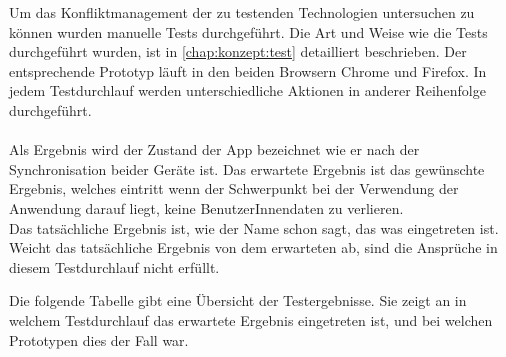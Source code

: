 Um das Konfliktmanagement der zu testenden Technologien untersuchen zu können wurden manuelle Tests durchgeführt.
Die Art und Weise wie die Tests durchgeführt wurden, ist in \autoref{chap:konzept:test} detailliert beschrieben. Der entsprechende Prototyp läuft in den beiden Browsern Chrome und Firefox. In jedem Testdurchlauf werden unterschiedliche Aktionen in anderer Reihenfolge durchgeführt.\\\\
Als Ergebnis wird der Zustand der \gls{App} bezeichnet wie er nach der Synchronisation beider Geräte ist.
Das erwartete Ergebnis ist das gewünschte Ergebnis, welches eintritt wenn der Schwerpunkt bei der Verwendung der Anwendung darauf liegt, keine BenutzerInnendaten zu verlieren.\\
Das tatsächliche Ergebnis ist, wie der Name schon sagt, das was eingetreten ist. Weicht das tatsächliche Ergebnis von dem erwarteten ab, sind die Ansprüche in diesem Testdurchlauf nicht erfüllt. 
% 
% 

%
%

%
%
%

% 
% 
% 
% 
Die folgende Tabelle gibt eine Übersicht der Testergebnisse. Sie zeigt an in welchem Testdurchlauf das erwartete Ergebnis eingetreten ist, und bei welchen Prototypen dies der Fall war.
